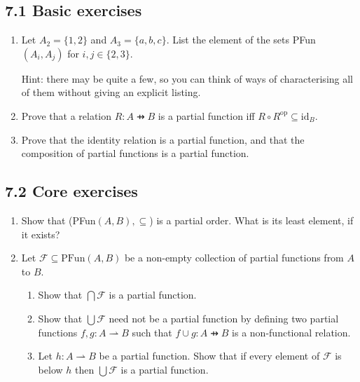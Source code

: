 \documentclass[10pt,\jkfside,a4paper]{article}
\begin{document}
\subsection*{7.1 Basic exercises}

\begin{enumerate}

\item Let $A_2 = \{1, 2\}$ and $A_3 = \{a, b, c\}$. List the element of the sets PFun$(A_i, A_j)$ for 
$i, j \in \{2, 3\}$.

Hint: there may be quite a few, so you can think of ways of characterising all of them without giving 
an explicit listing.



\item Prove that a relation $R: A \pfun B$ is a partial function iff $R \circ R^{\text{op}} \subseteq \text{id}_B$.



\item Prove that the identity relation is a partial function, and that the composition of partial functions is a partial function.



\end{enumerate}

\subsection*{7.2 Core exercises}

\begin{enumerate}

\item Show that (PFun$(A, B), \subseteq$) is a partial order. What is its least element, if it exists?



\item Let $\mathcal{F} \subseteq \text{PFun}(A, B)$ be a non-empty collection of partial functions from $A$ to $B$.

\begin{enumerate}

\item Show that $\bigcap \mathcal{F}$ is a partial function.



\item Show that $\bigcup \mathcal{F}$ need not be a partial function by defining two partial functions $f, g: A \rightharpoonup B$ 
such that $f \cup g: A \pfun B$ is a non-functional relation.



\item Let $h: A \rightharpoonup B$ be a partial function. Show that if every element of $\mathcal{F}$ is below $h$ then $\bigcup \mathcal{F}$ is 
a partial function.



\end{enumerate}

\end{enumerate}
\end{document}
